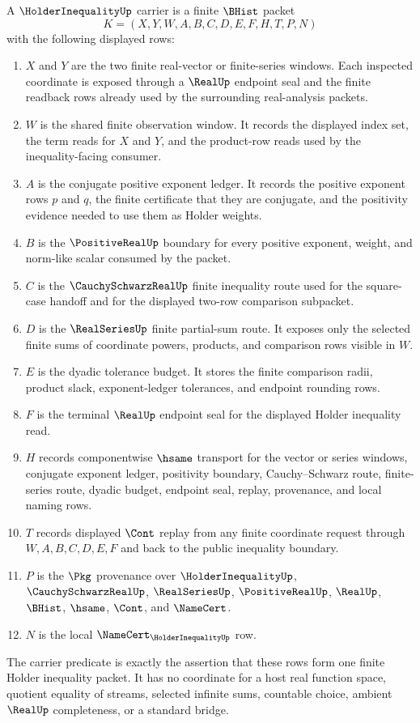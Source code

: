 \begin{definition}\label{def:holder-inequality-carrier}
A $\HolderInequalityUp$ carrier is a finite $\BHist$ packet
$$
K=(X,Y,W,A,B,C,D,E,F,H,T,P,N)
$$
with the following displayed rows:
\begin{enumerate}
\item $X$ and $Y$ are the two finite real-vector or finite-series windows. Each inspected coordinate is exposed through a $\RealUp$ endpoint seal and the finite readback rows already used by the surrounding real-analysis packets.
\item $W$ is the shared finite observation window. It records the displayed index set, the term reads for $X$ and $Y$, and the product-row reads used by the inequality-facing consumer.
\item $A$ is the conjugate positive exponent ledger. It records the positive exponent rows $p$ and $q$, the finite certificate that they are conjugate, and the positivity evidence needed to use them as Holder weights.
\item $B$ is the $\PositiveRealUp$ boundary for every positive exponent, weight, and norm-like scalar consumed by the packet.
\item $C$ is the $\CauchySchwarzRealUp$ finite inequality route used for the square-case handoff and for the displayed two-row comparison subpacket.
\item $D$ is the $\RealSeriesUp$ finite partial-sum route. It exposes only the selected finite sums of coordinate powers, products, and comparison rows visible in $W$.
\item $E$ is the dyadic tolerance budget. It stores the finite comparison radii, product slack, exponent-ledger tolerances, and endpoint rounding rows.
\item $F$ is the terminal $\RealUp$ endpoint seal for the displayed Holder inequality read.
\item $H$ records componentwise $\hsame$ transport for the vector or series windows, conjugate exponent ledger, positivity boundary, Cauchy--Schwarz route, finite-series route, dyadic budget, endpoint seal, replay, provenance, and local naming rows.
\item $T$ records displayed $\Cont$ replay from any finite coordinate request through $W,A,B,C,D,E,F$ and back to the public inequality boundary.
\item $P$ is the $\Pkg$ provenance over $\HolderInequalityUp$, $\CauchySchwarzRealUp$, $\RealSeriesUp$, $\PositiveRealUp$, $\RealUp$, $\BHist$, $\hsame$, $\Cont$, and $\NameCert$.
\item $N$ is the local $\NameCert_{\HolderInequalityUp}$ row.
\end{enumerate}
The carrier predicate is exactly the assertion that these rows form one finite Holder inequality packet. It has no coordinate for a host real function space, quotient equality of streams, selected infinite sums, countable choice, ambient $\RealUp$ completeness, or a standard bridge.
\end{definition}

